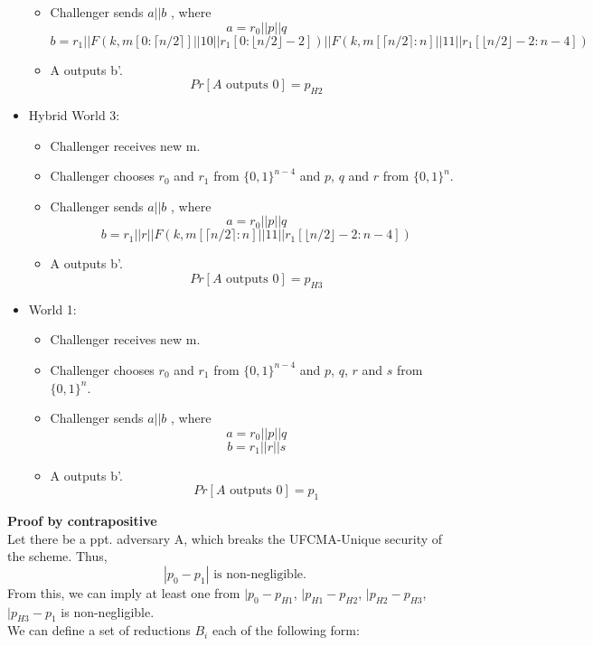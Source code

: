 \documentclass{article}
\begin{document}
\begin{itemize}
\begin{itemize}
            \item Challenger sends $a||b$ , where
\[a=r_0\big|\big|p\big|\big|q\]
\[b=r_1\big|\big|F(k,m[0:\lceil n/2 \rceil ]\big|\big|10\big|\big|r_1[0:\lfloor n/2 \rfloor -2])\big|\big|F(k,m[\lceil n/2 \rceil:n ]\big|\big|11\big|\big|r_1[\lfloor n/2 \rfloor -2:n-4])\]
            \item A outputs b'.
            \[Pr[A \text{ outputs }0]=p_{H2}\]
        \end{itemize}
        \item Hybrid World 3:
        \begin{itemize}
            \item Challenger receives new m.
            \item Challenger chooses $r_0$ and $r_1$ from $\{0,1\}^{n-4}$ and $p$, $q$ and $r$ from $\{0,1\}^{n}$.
            \item Challenger sends $a||b$ , where
\[a=r_0\big|\big|p\big|\big|q\]
\[b=r_1\big|\big|r\big|\big|F(k,m[\lceil n/2 \rceil:n ]\big|\big|11\big|\big|r_1[\lfloor n/2 \rfloor -2:n-4])\]
            \item A outputs b'.
            \[Pr[A \text{ outputs }0]=p_{H3}\]
        \end{itemize}
        \item World 1: 
        \begin{itemize}
            \item Challenger receives new m.
            \item Challenger chooses $r_0$ and $r_1$ from $\{0,1\}^{n-4}$ and $p$, $q$, $r$ and $s$ from $\{0,1\}^{n}$.
            \item Challenger sends $a||b$ , where
\[a=r_0\big|\big|p\big|\big|q\]
\[b=r_1\big|\big|r\big|\big|s\]
            \item A outputs b'.
            \[Pr[A \text{ outputs }0]=p_{1}\]
        \end{itemize}
    \end{itemize}
\textbf{Proof by contrapositive}\\
Let there be a ppt. adversary A, which breaks the UFCMA-Unique security of the scheme. Thus,
\[|p_0-p_1|\text{ is non-negligible.}\]
From this, we can imply at least one from $|p_0-p_{H1}$, $|p_{H1}-p_{H2}$, $|p_{H2}-p_{H3}$, $|p_{H3}-p_1$ is non-negligible.\\
We can define a set of reductions $B_i$ each of the following form:
\end{document}
